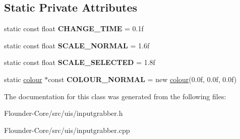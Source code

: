 \subsection*{Static Private Attributes}
\begin{DoxyCompactItemize}
\item 
\mbox{\label{classflounder_1_1inputgrabber_a3eb0f15e060b36939196d30aace889e2}} 
static const float {\bfseries C\+H\+A\+N\+G\+E\+\_\+\+T\+I\+ME} = 0.\+1f
\item 
\mbox{\label{classflounder_1_1inputgrabber_a1782b06602f89a1904eb45a6f19230f5}} 
static const float {\bfseries S\+C\+A\+L\+E\+\_\+\+N\+O\+R\+M\+AL} = 1.\+6f
\item 
\mbox{\label{classflounder_1_1inputgrabber_ad97b9f57014d55128e0dbcef068c70ce}} 
static const float {\bfseries S\+C\+A\+L\+E\+\_\+\+S\+E\+L\+E\+C\+T\+ED} = 1.\+8f
\item 
\mbox{\label{classflounder_1_1inputgrabber_ac4fc1d45c2d9450f3b3d36c152a317c3}} 
static \hyperlink{classflounder_1_1colour}{colour} $\ast$const {\bfseries C\+O\+L\+O\+U\+R\+\_\+\+N\+O\+R\+M\+AL} = new \hyperlink{classflounder_1_1colour}{colour}(0.\+0f, 0.\+0f, 0.\+0f)
\end{DoxyCompactItemize}


The documentation for this class was generated from the following files\+:\begin{DoxyCompactItemize}
\item 
Flounder-\/\+Core/src/uis/inputgrabber.\+h\item 
Flounder-\/\+Core/src/uis/inputgrabber.\+cpp\end{DoxyCompactItemize}

